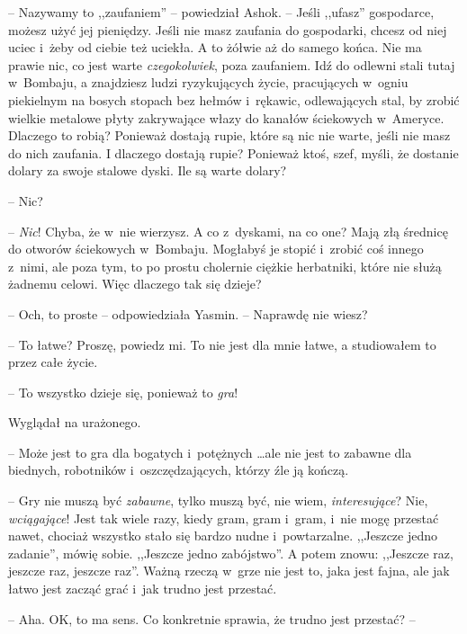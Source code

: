 \documentclass[oneside,polish,11pt,rmheadings]{mwbk}
\begin{document}
-- Nazywamy to ,,zaufaniem'' -- powiedział Ashok. -- Jeśli ,,ufasz'' gospodarce, możesz użyć jej pieniędzy. Jeśli nie masz zaufania do gospodarki, chcesz od niej uciec i~żeby od ciebie też uciekła. A to żółwie aż do samego końca. Nie ma prawie nic, co jest warte \textit{czegokolwiek}, poza zaufaniem. Idź do odlewni stali tutaj w~Bombaju, a znajdziesz ludzi ryzykujących życie, pracujących w~ogniu piekielnym na bosych stopach bez hełmów i~rękawic, odlewających stal, by zrobić wielkie metalowe płyty zakrywające włazy do kanałów ściekowych w~Ameryce. Dlaczego to robią? Ponieważ dostają rupie, które są nic nie warte, jeśli nie masz do nich zaufania. I dlaczego dostają rupie? Ponieważ ktoś, szef, myśli, że dostanie dolary za swoje stalowe dyski. Ile są warte dolary?

-- Nic? 

-- \textit{Nic}! Chyba, że w~nie wierzysz. A co z~dyskami, na co one? Mają złą średnicę do otworów ściekowych w~Bombaju. Mogłabyś je stopić i~zrobić coś innego z~nimi, ale poza tym, to po prostu cholernie ciężkie herbatniki, które nie służą żadnemu celowi. Więc dlaczego tak się dzieje?

-- Och, to proste -- odpowiedziała  Yasmin. -- Naprawdę nie wiesz?

-- To łatwe? Proszę, powiedz mi. To nie jest dla mnie łatwe, a studiowałem to przez całe życie. 

-- To wszystko dzieje się, ponieważ to \textit{gra}!

Wyglądał na urażonego. 

-- Może jest to gra dla bogatych i~potężnych  \ldots  ale nie jest to zabawne dla biednych, robotników i~oszczędzających, którzy źle ją kończą.

-- Gry nie muszą być \textit{zabawne}, tylko muszą być, nie wiem, \textit{interesujące}? Nie, \textit{wciągające}! Jest tak wiele razy, kiedy gram, gram i~gram, i~nie mogę przestać nawet, chociaż wszystko stało się bardzo nudne i~powtarzalne. ,,Jeszcze jedno zadanie'', mówię sobie. ,,Jeszcze jedno zabójstwo''. A potem znowu: ,,Jeszcze raz, jeszcze raz, jeszcze raz''. Ważną rzeczą w~grze nie jest to, jaka jest fajna, ale jak łatwo jest zacząć grać i~jak trudno jest przestać.

-- Aha. OK, to ma sens. Co konkretnie sprawia, że trudno jest przestać? -- 
\end{document}
